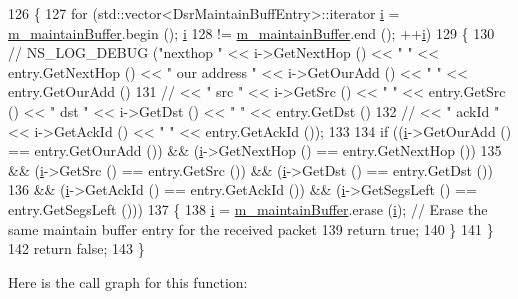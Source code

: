 \begin{DoxyCode}
126 \{
127   \textcolor{keywordflow}{for} (std::vector<DsrMaintainBuffEntry>::iterator \hyperlink{bernuolliDistribution_8m_a6f6ccfcf58b31cb6412107d9d5281426}{i} = \hyperlink{classns3_1_1dsr_1_1DsrMaintainBuffer_a942fc86793c5a6f538a9f0bd69709ce9}{m\_maintainBuffer}.begin (); 
      \hyperlink{bernuolliDistribution_8m_a6f6ccfcf58b31cb6412107d9d5281426}{i}
128        != \hyperlink{classns3_1_1dsr_1_1DsrMaintainBuffer_a942fc86793c5a6f538a9f0bd69709ce9}{m\_maintainBuffer}.end (); ++\hyperlink{bernuolliDistribution_8m_a6f6ccfcf58b31cb6412107d9d5281426}{i})
129     \{
130 \textcolor{comment}{//      NS\_LOG\_DEBUG ("nexthop " << i->GetNextHop () << " " << entry.GetNextHop () << " our address " <<
       i->GetOurAdd () << " " << entry.GetOurAdd ()}
131 \textcolor{comment}{//                               << " src " << i->GetSrc () << " " << entry.GetSrc () << " dst " <<
       i->GetDst () << " " << entry.GetDst ()}
132 \textcolor{comment}{//                               << " ackId " << i->GetAckId () << " " << entry.GetAckId ());}
133 
134       \textcolor{keywordflow}{if} ((\hyperlink{bernuolliDistribution_8m_a6f6ccfcf58b31cb6412107d9d5281426}{i}->GetOurAdd () == entry.GetOurAdd ()) && (\hyperlink{bernuolliDistribution_8m_a6f6ccfcf58b31cb6412107d9d5281426}{i}->GetNextHop () == entry.GetNextHop ())
135           && (\hyperlink{bernuolliDistribution_8m_a6f6ccfcf58b31cb6412107d9d5281426}{i}->GetSrc () == entry.GetSrc ()) && (\hyperlink{bernuolliDistribution_8m_a6f6ccfcf58b31cb6412107d9d5281426}{i}->GetDst () == entry.GetDst ())
136           && (\hyperlink{bernuolliDistribution_8m_a6f6ccfcf58b31cb6412107d9d5281426}{i}->GetAckId () == entry.GetAckId ()) && (\hyperlink{bernuolliDistribution_8m_a6f6ccfcf58b31cb6412107d9d5281426}{i}->GetSegsLeft () == entry.GetSegsLeft ()))
137         \{
138           \hyperlink{bernuolliDistribution_8m_a6f6ccfcf58b31cb6412107d9d5281426}{i} = \hyperlink{classns3_1_1dsr_1_1DsrMaintainBuffer_a942fc86793c5a6f538a9f0bd69709ce9}{m\_maintainBuffer}.erase (\hyperlink{bernuolliDistribution_8m_a6f6ccfcf58b31cb6412107d9d5281426}{i});   \textcolor{comment}{// Erase the same maintain buffer entry for
       the received packet}
139           \textcolor{keywordflow}{return} \textcolor{keyword}{true};
140         \}
141     \}
142   \textcolor{keywordflow}{return} \textcolor{keyword}{false};
143 \}
\end{DoxyCode}


Here is the call graph for this function\+:




